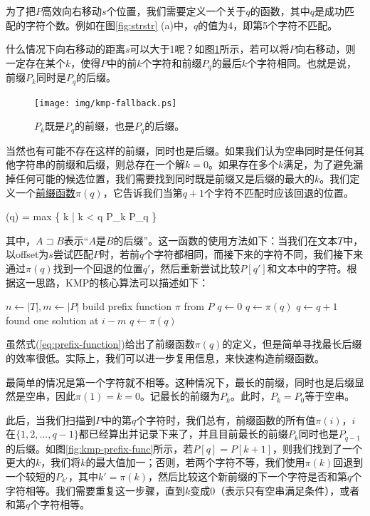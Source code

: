 \documentclass[UTF8]{article}
\begin{document}
为了把$P$高效向右移动$s$个位置，我们需要定义一个关于$q$的函数，其中$q$是成功匹配的字符个数。例如在图\ref{fig:strstr} (a)中，$q$的值为4，即第5个字符不匹配。

什么情况下向右移动的距离$s$可以大于1呢？如图\ref{fig:kmp-fallback}所示，若可以将$P$向右移动，则一定存在某个$k$，使得$P$中的前$k$个字符和前缀$P_q$的最后$k$个字符相同。也就是说，前缀$P_k$同时是$P_q$的后缀。

\begin{figure}[htbp]
 \centering
 \texttt{[image: img/kmp-fallback.ps]}
 \caption{$P_k$既是$P_q$的前缀，也是$P_q$的后缀。}
 \label{fig:kmp-fallback}
\end{figure}

当然也有可能不存在这样的前缀，同时也是后缀。如果我们认为空串同时是任何其他字符串的前缀和后缀，则总存在一个解$k=0$。如果存在多个$k$满足，为了避免漏掉任何可能的候选位置，我们需要找到同时既是前缀又是后缀的最大的$k$。我们定义一个\underline{前缀函数}$\pi(q)$，它告诉我们当第$q+1$个字符不匹配时应该回退的位置\cite{CLRS}。

\be
\pi(q) = max \{ k | k < q \land P_k \sqsupset P_q \}
\label{eq:prefix-function}
\ee

其中，$A \sqsupset B$表示“$A$是$B$的后缀”。这一函数的使用方法如下：当我们在文本$T$中，以offset为$s$尝试匹配$P$时，若前$q$个字符都相同，而接下来的字符不同，我们接下来通过$\pi(q)$找到一个回退的位置$q'$，然后重新尝试比较$P[q']$和文本中的字符。根据这一思路，KMP的核心算法可以描述如下：

\begin{algorithmic}[1]
  \State $n \gets |T|, m \gets |P|$
  \State build prefix function $\pi$ from $P$
  \State $q \gets 0$ 
      \State $q \gets \pi(q)$
    \EndWhile
      \State $q \gets q + 1$
    \EndIf
      \State found one solution at $i - m$
      \State $q \gets \pi(q)$ 
    \EndIf
  \EndFor
\EndFunction
\end{algorithmic}

虽然式(\ref{eq:prefix-function})给出了前缀函数$\pi(q)$的定义，但是简单寻找最长后缀的效率很低。实际上，我们可以进一步复用信息，来快速构造前缀函数。

最简单的情况是第一个字符就不相等。这种情况下，最长的前缀，同时也是后缀显然是空串，因此$\pi(1) = k = 0$。记最长的前缀为$P_k$。此时，$P_k = P_0$等于空串。

此后，当我们扫描到$P$中的第$q$个字符时，我们总有，前缀函数的所有值$\pi(i)$，$i$在$\{1, 2, ..., q-1 \}$都已经算出并记录下来了，并且目前最长的前缀$P_k$同时也是$P_{q-1}$的后缀。如图\ref{fig:kmp-prefix-func}所示，若$P[q] = P[k+1]$，则我们找到了一个更大的$k$，我们将$k$的最大值加一；否则，若两个字符不等，我们使用$\pi(k)$回退到一个较短的$P_{k'}$，其中$k' = \pi(k)$，然后比较这个新前缀的下一个字符是否和第$q$个字符相等。我们需要重复这一步骤，直到$k$变成0（表示只有空串满足条件），或者和第$q$个字符相等。
\end{document}
